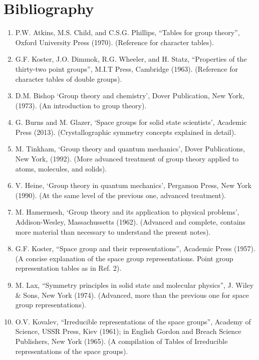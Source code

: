 \documentclass[12pt,a4paper]{article}
\begin{document}
\section{\color{coral}Bibliography}
\begin{enumerate}

\item
P.W. Atkins, M.S. Child, and C.S.G. Phillips, ``Tables for group theory'',
Oxford University Press (1970). (Reference for character tables).

\item
G.F. Koster, J.O. Dimmok, R.G. Wheeler, and H. Statz, ``Properties
of the thirty-two point groups'', M.I.T Press, Cambridge (1963). 
(Reference for character tables of double groups).

\item
D.M. Bishop `Group theory and chemistry', Dover Publication, New York, (1973).
(An introduction to group theory).

\item
G. Burns and M. Glazer, `Space groups for solid state scientists', Academic Press
(2013). (Crystallographic symmetry concepts explained in detail). 

\item
M. Tinkham, `Group theory and quantum mechanics', Dover Publications, New York,
(1992). (More advanced treatment of group theory applied to atoms, molecules,
and solids).

\item
V. Heine, `Group theory in quantum mechanics', Pergamon Press, New York (1990).
(At the same level of the previous one, advanced treatment).

\item
M. Hamermesh, `Group theory and its application to physical problems',
Addison-Wesley, Massachussetts (1962). 
(Advanced and complete, contains more material than necessary to
understand the present notes).

\item
G.F. Koster, ``Space group and their representations'', Academic Press (1957).
(A concise explanation of the space group representations. Point
group representation tables as in Ref. 2).

\item
M. Lax, ``Symmetry principles in solid state and molecular physics'',
J. Wiley \& Sons, New York (1974).
(Advanced, more than the previous one for space group representations).

\item
O.V. Kovalev, ``Irreducible representations of the space groups'',
Academy of Science, USSR Press, Kiev (1961); in English
Gordon and Breach Science Publishers, New York (1965).
(A compilation of Tables of Irreducible representations of the space groups).


\end{enumerate}
\end{document}
